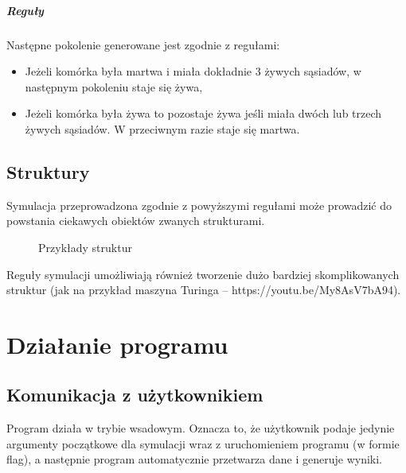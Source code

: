 \documentclass{report}
\begin{document}
\paragraph{Reguły} Następne pokolenie generowane jest zgodnie z regułami:
\begin{itemize}
\item Jeżeli komórka była martwa i miała dokładnie 3 żywych sąsiadów, w następnym pokoleniu staje się żywa,
\item Jeżeli komórka była żywa to pozostaje żywa jeśli miała dwóch lub trzech żywych sąsiadów. W przeciwnym razie staje się martwa.
\end{itemize}

\section{Struktury}
Symulacja przeprowadzona zgodnie z powyższymi regułami może prowadzić do powstania ciekawych obiektów zwanych strukturami. 

\begin{figure}[h]
\centering
\setlength{\fboxsep}{0pt} %
\setlength{\fboxrule}{1pt} %
\caption{Przykłady struktur}
\end{figure}

Reguły symulacji umożliwiają również tworzenie dużo bardziej skomplikowanych struktur (jak na przykład maszyna Turinga -- https://youtu.be/My8AsV7bA94).



\chapter{Działanie programu}

\section{Komunikacja z użytkownikiem}
Program działa w trybie wsadowym. Oznacza to, że użytkownik podaje jedynie argumenty początkowe dla symulacji wraz z uruchomieniem programu (w formie flag), a następnie program automatycznie przetwarza dane i generuje wyniki.
\end{document}
